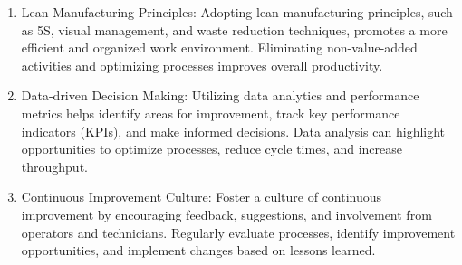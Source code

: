 \documentclass{article}
\begin{document}
\begin{enumerate}
\item Lean Manufacturing Principles: Adopting lean manufacturing principles, such as 5S, visual management, and waste reduction techniques, promotes a more efficient and organized work environment. Eliminating non-value-added activities and optimizing processes improves overall productivity.

\item Data-driven Decision Making: Utilizing data analytics and performance metrics helps identify areas for improvement, track key performance indicators (KPIs), and make informed decisions. Data analysis can highlight opportunities to optimize processes, reduce cycle times, and increase throughput.

\item Continuous Improvement Culture: Foster a culture of continuous improvement by encouraging feedback, suggestions, and involvement from operators and technicians. Regularly evaluate processes, identify improvement opportunities, and implement changes based on lessons learned.
\end{enumerate}
\end{document}
